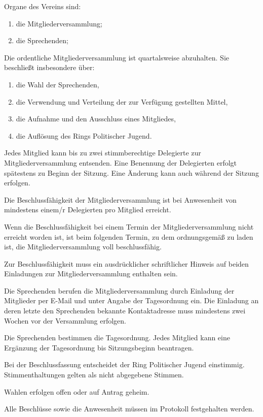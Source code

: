 \documentclass[10pt,a4paper,oneside,parskip=half]{scrartcl}
\begin{document}
\begin{contract}
Organe des Vereins sind:
\begin{enumerate}
\item die Mitgliederversammlung;
\item die Sprechenden;
\end{enumerate}

Die ordentliche Mitgliederversammlung ist quartalsweise abzuhalten. Sie beschließt insbesondere über:
\begin{enumerate}
\item die Wahl der Sprechenden,
\item die Verwendung und Verteilung der zur Verfügung gestellten Mittel,
\item die Aufnahme und den Ausschluss eines Mitgliedes,
\item die Auflösung des Rings Politischer Jugend.
\end{enumerate}

Jedes Mitglied kann bis zu zwei stimmberechtige Delegierte zur Mitgliederversammlung entsenden. Eine Benennung der Delegierten erfolgt spätestens zu Beginn der Sitzung. Eine Änderung kann auch während der Sitzung erfolgen.

Die Beschlussfähigkeit der Mitgliederversammlung ist bei Anwesenheit von mindestens einem/r Delegierten pro Mitglied erreicht.

Wenn die Beschlussfähigkeit bei einem Termin der Mitgliederversammlung nicht erreicht worden ist, ist beim folgenden Termin, zu dem ordnungsgemäß zu laden ist, die Mitgliederversammlung voll beschlussfähig.

Zur Beschlussfähigkeit muss ein ausdrücklicher schriftlicher Hinweis auf beiden Einladungen zur Mitgliederversammlung enthalten sein.

Die Sprechenden berufen die Mitgliederversammlung durch Einladung der Mitglieder per E-Mail und unter Angabe der Tagesordnung ein. Die Einladung an deren letzte den Sprechenden bekannte Kontaktadresse muss mindestens zwei Wochen vor der Versammlung erfolgen.

Die Sprechenden bestimmen die Tagesordnung. Jedes Mitglied kann eine Ergänzung der Tagesordnung bis Sitzungsbeginn beantragen.

Bei der Beschlussfassung entscheidet der Ring Politischer Jugend einstimmig. Stimmenthaltungen gelten als nicht abgegebene Stimmen.

Wahlen erfolgen offen oder auf Antrag geheim.

Alle Beschlüsse sowie die Anwesenheit müssen im Protokoll festgehalten werden.


\end{contract}
\end{document}
